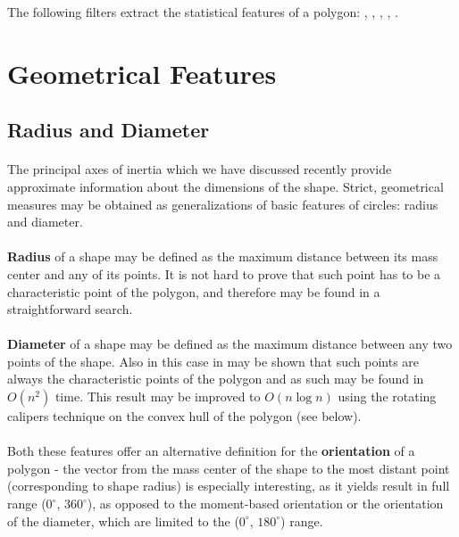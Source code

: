 \begin{refImpl}
The following \studio filters extract the statistical features of a polygon: 
, 
, 
, 
,
. 
\end{refImpl}

\section{Geometrical Features}

\subsection{Radius and Diameter}

\paragraph*{}
The principal axes of inertia which we have discussed recently provide approximate information about the dimensions of the shape. Strict, geometrical measures may be obtained as generalizations of basic features of circles: radius and diameter.

\paragraph*{}
\textbf{Radius} of a shape may be defined as the maximum distance between its mass center and any of its points. It is not hard to prove that such point has to be a characteristic point of the polygon, and therefore may be found in a straightforward search.

\paragraph*{}
\textbf{Diameter} of a shape may be defined as the maximum distance between any two points of the shape. Also in this case in may be shown that such points are always the characteristic points of the polygon and as such may be found in $O(n^2)$ time. This result may be improved to $O(n\log n)$ using the rotating calipers technique\cite{Toussaint83} on the convex hull of the polygon (see below).

\paragraph*{}
Both these features offer an alternative definition for the \textbf{orientation} of a polygon - the vector from the mass center of the shape to the most distant point (corresponding to shape radius) is especially interesting, as it yields result in full range ($0^{\circ}$, $360^{\circ}$), as opposed to the moment-based orientation or the orientation of the diameter, which are limited to the ($0^{\circ}$, $180^{\circ}$) range.

